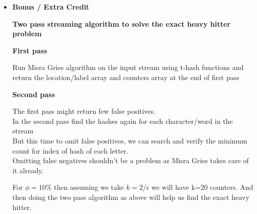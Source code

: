 \documentclass[11pt]{article}
\begin{document}
\begin{itemize}
\begin{itemize}
\end{itemize}

\item[] \textbf{Bonus / Extra Credit}

\textbf{Two pass streaming algorithm to solve the exact heavy hitter problem}


\textbf{First pass}

Run Misra Gries algorithm on the input stream using t-hash functions and return the location/label array and counters array at the end of first pass

\textbf{Second pass}

The first pass might return few false positives. \\
In the second pass find the hashes again for each character/word in the stream\\
But this time to omit false positives, we can search and verify the minimum count for index of hash of each letter. \\
Omitting false negatives shouldn't be a problem as Misra Gries takes care of it already.

For $\phi =10\%$  then assuming we take $k= 2/ \epsilon$ we will have k=20 counters. And then doing the two pass algorithm as above will help us find the exact heavy hitter.

	
\end{itemize}
\end{document}
